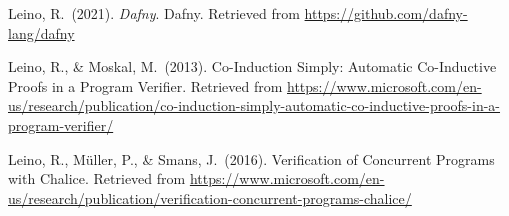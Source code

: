 \documentclass[12pt,twoside]{article}
\begin{document}
{\begin{thebibliography}{1079}
\mdbibitemlabel{}Leino, R.~(2021). \emph{Dafny}. Dafny. Retrieved from \href{https://github.com/dafny-lang/dafny}{{\ttfamily https://\hspace{0pt}github.\hspace{0pt}com/\hspace{0pt}dafny-\hspace{0pt}lang/\hspace{0pt}dafny}}%

\mdbibitemlabel{}Leino, R., \& Moskal, M.~(2013). Co-Induction Simply: Automatic Co-Inductive Proofs in a Program Verifier. Retrieved from \href{https://www.microsoft.com/en-us/research/publication/co-induction-simply-automatic-co-inductive-proofs-in-a-program-verifier/}{{\ttfamily https://\hspace{0pt}www.\hspace{0pt}microsoft.\hspace{0pt}com/\hspace{0pt}en-\hspace{0pt}us/\hspace{0pt}research/\hspace{0pt}publication/\hspace{0pt}co-\hspace{0pt}induction-\hspace{0pt}simply-\hspace{0pt}automatic-\hspace{0pt}co-\hspace{0pt}inductive-\hspace{0pt}proofs-\hspace{0pt}in-\hspace{0pt}a-\hspace{0pt}program-\hspace{0pt}verifier/\hspace{0pt}}}%

\mdbibitemlabel{}Leino, R., Müller, P., \& Smans, J.~(2016). Verification of Concurrent Programs with Chalice. Retrieved from \href{https://www.microsoft.com/en-us/research/publication/verification-concurrent-programs-chalice/}{{\ttfamily https://\hspace{0pt}www.\hspace{0pt}microsoft.\hspace{0pt}com/\hspace{0pt}en-\hspace{0pt}us/\hspace{0pt}research/\hspace{0pt}publication/\hspace{0pt}verification-\hspace{0pt}concurrent-\hspace{0pt}programs-\hspace{0pt}chalice/\hspace{0pt}}}%


\end{thebibliography}}
\end{document}
